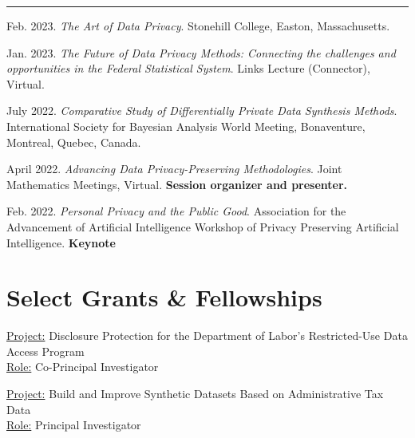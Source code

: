 \documentclass[12, letterpaper, roman]{moderncv} %
\begin{document}
\rule{\textwidth}{0.1pt}
\begin{etaremune}[topsep=0pt, itemsep=4pt, partopsep=0pt, parsep=0pt]
\smallskip
    
    \item Feb. 2023. \textit{The Art of Data Privacy}. Stonehill College, Easton, Massachusetts.
    
    \item Jan. 2023. \textit{The Future of Data Privacy Methods: Connecting the challenges and opportunities in the Federal Statistical System}. Links Lecture (Connector), Virtual.

    \item July 2022. \textit{Comparative Study of Differentially Private Data Synthesis Methods}. International Society for Bayesian Analysis World Meeting, Bonaventure, Montreal, Quebec, Canada.

    \item April 2022. \textit{Advancing Data Privacy-Preserving Methodologies}. Joint Mathematics Meetings, Virtual. \textbf{Session organizer and presenter.}
    
    \item Feb. 2022. \textit{Personal Privacy and the Public Good}. Association for the Advancement of Artificial Intelligence Workshop of Privacy Preserving Artificial Intelligence. \textbf{Keynote}
  
\end{etaremune}

\section{Select Grants \&  Fellowships}

    { 
        \underline{Project:} Disclosure Protection for the Department of Labor's Restricted-Use Data Access Program\\
        \underline{Role:} Co-Principal Investigator
    }

    \vspace{4pt}
    { 
        \underline{Project:} Build and Improve Synthetic Datasets Based on Administrative Tax Data\\
        \underline{Role:} Principal Investigator
    }
\end{document}

